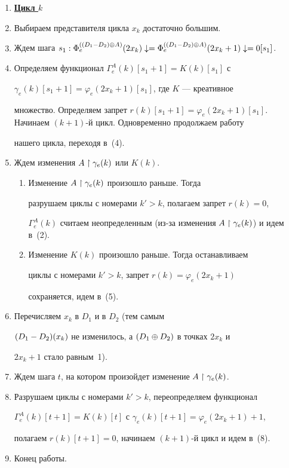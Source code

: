 \begin{enumerate}


\item[] \underline{\bf Цикл $k$}


\item Выбираем представителя цикла $x_k$ достаточно большим.


\item Ждем шага $s_1: \Phi_e^{\ssum}(2x_k)\downarrow=\Phi_e^{\ssum}


(2x_k+1)\downarrow=0 [s_1]$.


\item Определяем функционал $\Gamma_e^A(k)[s_1+1]=K(k)[s_1]$ с


$\gamma_e(k)[s_1+1]=\varphi_e(2x_k+1)[s_1]$, где $K$ --- креативное


множество. Определяем запрет $r(k)[s_1+1]=\varphi_e(2x_k+1)


[s_1]$. Начинаем $(k+1)$-й цикл. Одновременно продолжаем работу


нашего цикла, переходя в~(4).


\item Ждем изменения $A\restriction\gamma_e(k)$ или $K(k)$.


\begin{enumerate}


\item Изменение $A\restriction\gamma_e(k)$ произошло раньше. Тогда


разрушаем циклы с номерами $k'>k$, полагаем запрет $r(k)=0$,


$\Gamma_e^A(k)$ считаем неопределенным (из-за изменения $A\rst


\gamma_e(k)$) и идем в~(2).


\item Изменение $K(k)$ произошло раньше. Тогда останавливаем


циклы с номерами $k'>k$, запрет $r(k)=\varphi_e(2x_k+1)$


сохраняется, идем в~(5).


\end{enumerate}


\item Перечисляем $x_k$ в $D_1$ и в $D_2$ (тем самым


$(D_1-D_2)(x_k)$ не изменилось, а $(D_1\oplus D_2)$ в точках $2x_k$ и


$2x_k+1$ стало равным~1).


\item Ждем шага $t$, на котором произойдет изменение $A\restriction\gamma_e(k)$.


\item Разрушаем циклы с номерами $k'>k$, переопределяем функционал


$\Gamma_e^A(k)[t+1]=K(k)[t]$ с $\gamma_e(k)[t+1]=\varphi_e(2x_k+1)+1$,


полагаем $r(k)[t+1]=0$, начинаем $(k+1)$-й цикл и идем в~(8).


\item Конец работы.


\end{enumerate}





